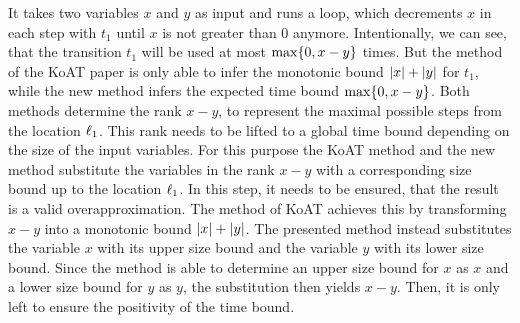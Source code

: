 It takes two variables $x$ and $y$ as input and runs a loop, which decrements $x$ in each step with $t_1$ until $x$ is not greater than 0 anymore.
Intentionally, we can see, that the transition $t_1$ will be used at most $\max \lbrace 0, x-y \rbrace$ times.
But the method of the KoAT paper \cite{koat} is only able to infer the monotonic bound $\left|x\right|+\left|y\right|$ for $t_1$, while the new method infers the expected time bound $\max \lbrace 0, x-y \rbrace$.
Both methods determine the rank $x-y$, to represent the maximal possible steps from the location $\ell_1$.
This rank needs to be lifted to a global time bound depending on the size of the input variables.
For this purpose the KoAT method and the new method substitute the variables in the rank $x-y$ with a corresponding size bound up to the location $\ell_1$.
In this step, it needs to be ensured, that the result is a valid overapproximation.
The method of KoAT achieves this by transforming $x-y$ into a monotonic bound $\left|x\right|+\left|y\right|$.
The presented method instead substitutes the variable $x$ with its upper size bound and the variable $y$ with its lower size bound.
Since the method is able to determine an upper size bound for $x$ as $x$ and a lower size bound for $y$ as $y$, the substitution then yields $x-y$.
Then, it is only left to ensure the positivity of the time bound.
